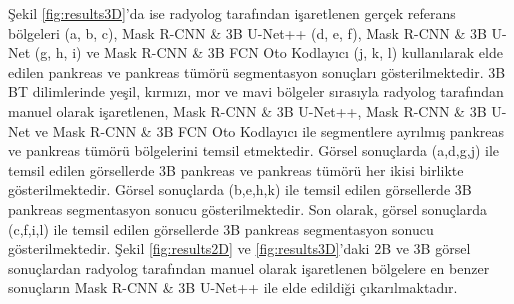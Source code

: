 Şekil \ref{fig:results3D}'da ise radyolog tarafından işaretlenen gerçek referans bölgeleri (a, b, c), Mask R-CNN \& 3B U-Net++ (d, e, f), Mask R-CNN \& 3B U-Net (g, h, i) ve Mask R-CNN \& 3B FCN Oto Kodlayıcı (j, k, l) kullanılarak elde edilen pankreas ve pankreas tümörü segmentasyon sonuçları gösterilmektedir. 3B BT dilimlerinde yeşil, kırmızı, mor ve mavi bölgeler sırasıyla radyolog tarafından manuel olarak işaretlenen, Mask R-CNN \& 3B U-Net++, Mask R-CNN \& 3B U-Net ve Mask R-CNN \& 3B FCN Oto Kodlayıcı ile segmentlere ayrılmış pankreas ve pankreas tümörü bölgelerini temsil etmektedir. Görsel sonuçlarda (a,d,g,j) ile temsil edilen görsellerde 3B pankreas ve pankreas tümörü her ikisi birlikte gösterilmektedir. Görsel sonuçlarda (b,e,h,k) ile temsil edilen görsellerde 3B pankreas segmentasyon sonucu gösterilmektedir. Son olarak, görsel sonuçlarda (c,f,i,l) ile temsil edilen görsellerde 3B pankreas segmentasyon sonucu gösterilmektedir.  Şekil \ref{fig:results2D} ve \ref{fig:results3D}'daki 2B ve 3B görsel sonuçlardan radyolog tarafından manuel olarak işaretlenen bölgelere en benzer sonuçların Mask R-CNN \& 3B U-Net++ ile elde edildiği çıkarılmaktadır. 

